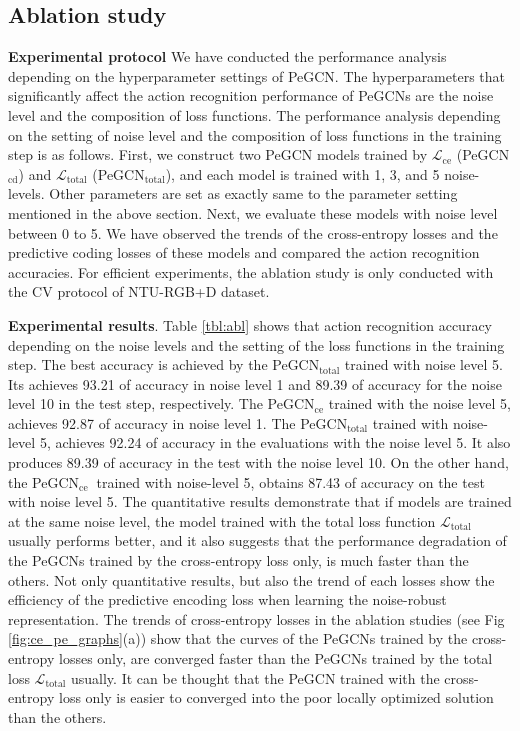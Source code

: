 \documentclass[runningheads]{llncs}
\begin{document}
\subsection{Ablation study}
\textbf{Experimental protocol} We have conducted the performance analysis depending on the hyperparameter settings of PeGCN. The hyperparameters that significantly affect the action recognition performance of PeGCNs are the noise level and the composition of loss functions. The performance analysis depending on the setting of noise level and the composition of loss functions in the training step is as follows. First, we construct two PeGCN models trained by $\mathcal{L}_{\text{ce}}$ (PeGCN$_{\text{cd}}$) and $\mathcal{L}_{\text{total}}$ (PeGCN$_{\text{total}}$), and each model is trained with 1, 3, and 5 noise-levels. Other parameters are set as exactly same to the parameter setting mentioned in the above section. Next, we evaluate these models with noise level between 0 to 5. We have observed the trends of the cross-entropy losses and the predictive coding losses of these models and compared the action recognition accuracies. For efficient experiments, the ablation study is only conducted with the CV protocol of NTU-RGB+D dataset. 

\textbf{Experimental results}. Table \ref{tbl:abl} shows that action recognition accuracy depending on the noise levels and the setting of the loss functions in the training step. The best accuracy is achieved by the PeGCN$_{\text{total}}$ trained with noise level 5. Its achieves 93.21 of accuracy in noise level 1 and 89.39 of accuracy for the noise level 10  in the test step, respectively. The PeGCN$_{\text{ce}}$ trained with the noise level 5, achieves 92.87 of accuracy in noise level 1. The PeGCN$_{\text{total}}$ trained with noise-level 5, achieves 92.24 of accuracy in the evaluations with the noise level 5. It also produces 89.39 of accuracy in the test with the noise level 10. On the other hand, the PeGCN$_{\text{ce }}$ trained with noise-level 5, obtains 87.43 of accuracy on the test with noise level 5. The quantitative results demonstrate that if models are trained at the same noise level, the model trained with the total loss function $\mathcal{L}_{\text{total}}$ usually performs better, and it also suggests that the performance degradation of the PeGCNs trained by the cross-entropy loss only, is much faster than the others.  Not only quantitative results, but also the trend of each losses show the efficiency of the predictive encoding loss when learning the noise-robust representation. The trends of cross-entropy losses in the ablation studies (see Fig \ref{fig:ce_pe_graphs}(a)) show that the curves of the PeGCNs trained by the cross-entropy losses only, are converged faster than the PeGCNs trained by the total loss $\mathcal{L}_{\text{total}}$ usually. It can be thought that the PeGCN trained with the cross-entropy loss only is easier to converged into the poor locally optimized solution than the others. 
\end{document}
